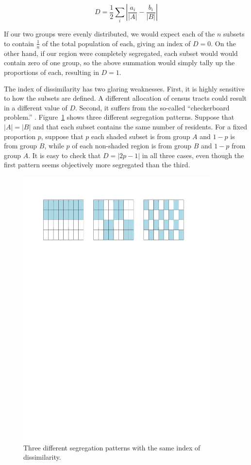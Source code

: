 \documentclass{article}
\theoremstyle{theorem}
\theoremstyle{definition}
\begin{document}
\begin{equation}
  D = \frac{1}{2} \sum_i \left\lvert \frac{a_i}{\lvert A \rvert} - \frac{b_i}{\lvert B \rvert} \right\rvert
\end{equation}

If our two groups were evenly distributed, we would expect each of the $n$ subsets to contain $\frac{1}{n}$ of the total population of each, giving an index of $D = 0$. On the other hand, if our region were completely segregated, each subset would would contain zero of one group, so the above summation would simply tally up the proportions of each, resulting in $D = 1$.

The index of dissimilarity has two glaring weaknesses. First, it is highly sensitive to how the subsets are defined. A different allocation of census tracts could result in a different value of $D$. Second, it suffers from the so-called ``checkerboard problem.'' \cite{morrill91}. Figure~\ref{fig:checkerboard} shows three different segregation patterns. Suppose that $|A| = |B|$ and that each subset contains the same number of residents. For a fixed proportion $p$, suppose that $p$ each shaded subset is from group $A$ and $1-p$ is from group $B$, while $p$ of each non-shaded region is from group $B$ and $1-p$ from group $A$. It is easy to check that $D = \lvert 2p-1 \rvert$ in all three cases, even though the first pattern seems objectively more segregated than the third.

\begin{figure}\centering
  \includegraphics[width=4in]{checkerboard.pdf}
  \caption{Three different segregation patterns with the same index of dissimilarity.}
  \label{fig:checkerboard}
\end{figure}
\end{document}
